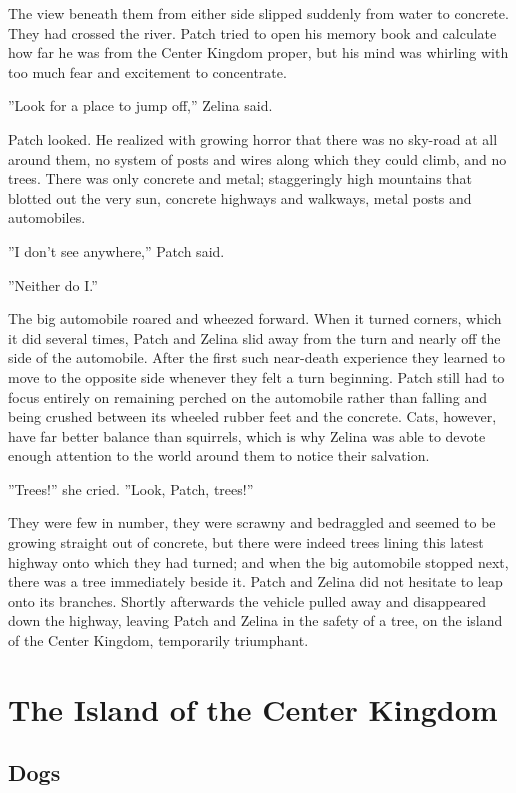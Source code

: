 \documentclass[12pt]{book}
\begin{document}
The view beneath them from either side slipped suddenly from water to concrete. They had crossed the river. Patch tried to open his memory book and calculate how far he was from the Center Kingdom proper, but his mind was whirling with too much fear and excitement to concentrate.

''Look for a place to jump off,'' Zelina said.

Patch looked. He realized with growing horror that there was no sky-road at all around them, no system of posts and wires along which they could climb, and no trees. There was only concrete and metal; staggeringly high mountains that blotted out the very sun, concrete highways and walkways, metal posts and automobiles.

''I don't see anywhere,'' Patch said.

''Neither do I.''

The big automobile roared and wheezed forward. When it turned corners, which it did several times, Patch and Zelina slid away from the turn and nearly off the side of the automobile. After the first such near-death experience they learned to move to the opposite side whenever they felt a turn beginning. Patch still had to focus entirely on remaining perched on the automobile rather than falling and being crushed between its wheeled rubber feet and the concrete. Cats, however, have far better balance than squirrels, which is why Zelina was able to devote enough attention to the world around them to notice their salvation.

''Trees!'' she cried. ''Look, Patch, trees!''

They were few in number, they were scrawny and bedraggled and seemed to be growing straight out of concrete, but there were indeed trees lining this latest highway onto which they had turned; and when the big automobile stopped next, there was a tree immediately beside it. Patch and Zelina did not hesitate to leap onto its branches. Shortly afterwards the vehicle pulled away and disappeared down the highway, leaving Patch and Zelina in the safety of a tree, on the island of the Center Kingdom, temporarily triumphant.


\chapter{The Island of the Center Kingdom}

\section{Dogs}
\end{document}
